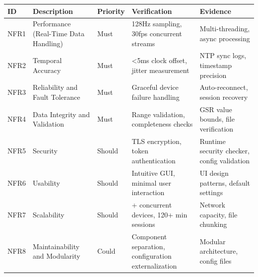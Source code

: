 \documentclass[12pt,a4paper]{article}
\begin{document}
\begin{longtable}[]{@{}
  >{\raggedright\arraybackslash}p{}
  >{\raggedright\arraybackslash}p{}
  >{\raggedright\arraybackslash}p{}
  >{\raggedright\arraybackslash}p{}
  >{\raggedright\arraybackslash}p{}@{}}
\toprule\noalign{}
\begin{minipage}[b]{\linewidth}\raggedright
ID
\end{minipage} & \begin{minipage}[b]{\linewidth}\raggedright
Description
\end{minipage} & \begin{minipage}[b]{\linewidth}\raggedright
Priority
\end{minipage} & \begin{minipage}[b]{\linewidth}\raggedright
Verification
\end{minipage} & \begin{minipage}[b]{\linewidth}\raggedright
Evidence
\end{minipage} \\
\midrule\noalign{}
\endhead
\bottomrule\noalign{}
\endlastfoot
NFR1 & Performance (Real-Time Data Handling) & Must & 128Hz sampling, 30fps concurrent streams & Multi-threading, async processing \\
NFR2 & Temporal Accuracy & Must & \textless5ms clock offset, jitter measurement & NTP sync logs, timestamp precision \\
NFR3 & Reliability and Fault Tolerance & Must & Graceful device failure handling & Auto-reconnect, session recovery \\
NFR4 & Data Integrity and Validation & Must & Range validation, completeness checks & GSR value bounds, file verification \\
NFR5 & Security & Should & TLS encryption, token authentication & Runtime security checker, config validation \\
NFR6 & Usability & Should & Intuitive GUI, minimal user interaction & UI design patterns, default settings \\
NFR7 & Scalability & Should & 8+ concurrent devices, 120+ min sessions & Network capacity, file chunking \\
NFR8 & Maintainability and Modularity & Could & Component separation, configuration externalization & Modular architecture, config files \\
\end{longtable}
\end{document}
